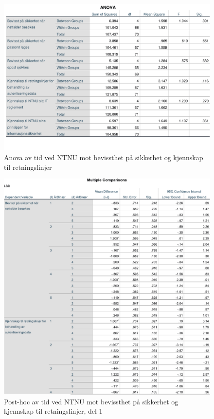 \begin{figure}[H]
    \centering
    \includegraphics[scale=0.7]{case_2/bilder/spss/anova_ttest/ansiennitet_bevissthetogkjennskap_anova.pdf}
    \caption[ansiennitet-bevissthetogkjennskap-anova]{Anova av tid ved NTNU mot bevissthet på sikkerhet og kjennskap til retningslinjer}
    \label{fig:ansiennitet-bevissthetogkjennskap-anova}
\end{figure}

\begin{figure}[H]
    \centering
    \includegraphics[scale=0.7]{case_2/bilder/spss/anova_ttest/ansiennitet_bevissthetogkjennskap_posthoc_1.pdf}
    \caption[ansiennitet-bevissthetogkjennskap-posthoc-1]{Post-hoc av tid ved NTNU mot bevissthet på sikkerhet og kjennskap til retningslinjer, del 1}
    \label{fig:ansiennitet-bevissthetogkjennskap-posthoc-1}
\end{figure}

